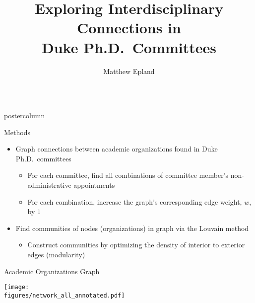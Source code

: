 \documentclass{beamer}
\title{\huge Exploring Interdisciplinary Connections in\\Duke Ph.D.\ Committees}
\author{Matthew Epland}
\institute[Duke]{Duke University}
\newcommand{\figures}{../outputs/plots}
\newlength{\columnheight}
\begin{document}
\begin{frame}
\vspace{1.7cm} %
\begin{columns}
\begin{column}{.57\textwidth}
\begin{beamercolorbox}[center]{postercolumn}
\begin{minipage}{.98\textwidth}  %
\parbox[t][\columnheight]{\textwidth}{ %

  \begin{myblock}{Methods}
    \begin{itemize}
      \item Graph connections between academic organizations found in Duke Ph.D.\ committees
      \begin{itemize}
        \item For each committee, find all combinations of committee member's non-administrative appointments
        \item For each combination, increase the graph's corresponding edge weight, $w$, by $1$
      \end{itemize}
    \end{itemize}

    \vspace{0.5cm}

    \begin{center}
    \end{center}

    \vspace{0.5cm}

    \begin{itemize}
      \item Find communities of nodes (organizations) in graph via the Louvain method \cite{louvain}
      \begin{itemize}
        \item Construct communities by optimizing the density of interior to exterior edges (modularity)
      \end{itemize}
    \end{itemize}
  \end{myblock}\vfill


  \begin{myblock}{Academic Organizations Graph}
    \vspace{0.8cm}
    \begin{center}
      \texttt{[image: \\figures/network\_all\_annotated.pdf]}
    \end{center}
  \end{myblock}\vfill


}
\end{minipage}
\end{beamercolorbox}
\end{column}
\end{columns}
\end{frame}
\end{document}
